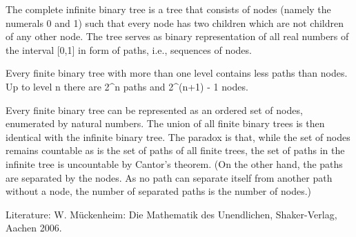 \documentclass[12pt]{article}
\begin{document}
The complete infinite binary tree is a tree that consists of nodes (namely the numerals 0 and 1) such that every node has two children which are not children of any other node. The tree serves as binary representation of all real numbers of the interval [0,1] in form of paths, i.e., sequences of nodes.

Every finite binary tree with more than one level contains less paths than nodes. Up to level n there are 2^n paths and 2^(n+1) - 1 nodes.

Every finite binary tree can be represented as an ordered set of nodes, enumerated by natural numbers. The union of all finite binary trees is then identical with the infinite binary tree. The paradox is that, while the set of nodes
remains countable as is the set of paths of all finite trees, the set of paths in the infinite tree is uncountable by Cantor's theorem. (On the other hand, the paths are separated by the nodes. As no path can separate itself from another path without a node, the number of separated paths is the number of nodes.) 


Literature: W. M\"uckenheim: Die Mathematik des Unendlichen, Shaker-Verlag, Aachen 2006.

\end{document}
